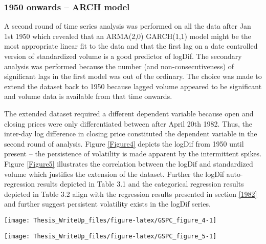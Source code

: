 \documentclass[11pt,preprint, authoryear]{elsarticle}
\let\origfigure\figure
\let\endorigfigure\endfigure
\renewenvironment{figure}[1][2] {
    \expandafter\origfigure\expandafter[H]
} {
    \endorigfigure
}
\numberwithin{equation}{section}
\numberwithin{figure}{section}
\numberwithin{table}{section}
\begin{document}
\hypertarget{onwards-arch-model}{%
\subsubsection{1950 onwards -- ARCH model}\label{onwards-arch-model}}

A second round of time series analysis was performed on all the data
after Jan 1st 1950 which revealed that an ARMA(2,0) GARCH(1,1) model
might be the most appropriate linear fit to the data and that the first
lag on a date controlled version of standardized volume is a good
predictor of logDif. The secondary analysis was performed because the
number (and non-consecutiveness) of significant lags in the first model
was out of the ordinary. The choice was made to extend the dataset back
to 1950 because lagged volume appeared to be significant and volume data
is available from that time onwards.

The extended dataset required a different dependent variable because
open and closing prices were only differentiated between after April
20th 1982. Thus, the inter-day log difference in closing price
constituted the dependent variable in the second round of analysis.
Figure \ref{Figure4} depicts the logDif from 1950 until present -- the
persistence of volatility is made apparent by the intermittent spikes.
Figure \ref{Figure5} illustrates the correlation between the logDif and
standardized volume which justifies the extension of the dataset.
Further the logDif auto-regression results depicted in Table 3.1 and the
categorical regression results depicted in Table 3.2 align with the
regression results presented in section \ref{1982} and further suggest
persistent volatility exists in the logDif series.

\begin{figure}[H]

{\centering \texttt{[image: Thesis\_WriteUp\_files/figure-latex/GSPC\_figure\_4-1]} 

}

\caption{SandP 500 Closing Price Log Difference 1950 – 2022 \label{Figure4}}\label{fig:GSPC_figure_4}
\end{figure}

\begin{figure}[H]

{\centering \texttt{[image: Thesis\_WriteUp\_files/figure-latex/GSPC\_figure\_5-1]} 

}

\caption{Standardized volume (red) and absolute logDiff (green) \label{Figure5}}\label{fig:GSPC_figure_5}
\end{figure}
\end{document}

